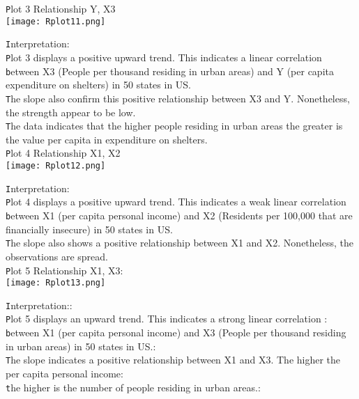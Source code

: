 \documentclass[12pt,letterpaper]{article}
\begin{document}
\begin{itemize}
	\texttt Plot 3 Relationship Y, X3\\
	
	
		\texttt{[image: Rplot11.png]}
		
	\texttt Interpretation:\\
	\texttt Plot 3 displays a positive upward trend. This indicates a linear correlation\\ 
	\texttt between X3 (People per thousand residing in urban areas) and Y (per capita expenditure on shelters) in 50 states in US. \\
	\texttt The slope also confirm this positive relationship between X3 and Y. Nonetheless, the strength appear to be low.\\   
	\texttt The data indicates that the higher people residing in urban areas the greater is the value per capita in expenditure on shelters.\\  

	\texttt Plot 4 Relationship X1, X2\\
	

	\texttt{[image: Rplot12.png]}
	
	\texttt Interpretation:\\
	\texttt Plot 4 displays a positive upward trend. This indicates a weak linear correlation\\ 
	\texttt between X1 (per capita personal income) and X2 (Residents per 100,000 that are financially insecure) in 50 states in US.\\
	\texttt The slope also shows a positive relationship between X1 and X2. Nonetheless, the observations are spread.\\  

	\texttt Plot 5 Relationship X1, X3:\\
	
	\texttt{[image: Rplot13.png]}
	
	\texttt Interpretation::\\
	\texttt Plot 5 displays an upward trend. This indicates a strong linear correlation :\\
	\texttt between X1 (per capita personal income) and X3 (People per thousand residing in urban areas) in 50 states in US.:\\ 
	\texttt The slope indicates a positive relationship between X1 and X3. The higher the per capita personal income:\\ 
	\texttt the higher is the number of people residing in urban areas.:\\ 
	

\end{itemize}
\end{document}
